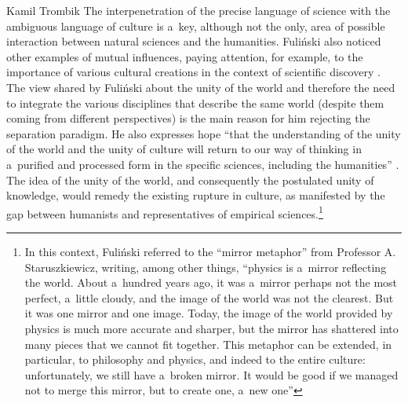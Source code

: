 \begin{artengenv}{Kamil Trombik}
The interpenetration of the precise language of science with the ambiguous language of culture is a~key, although not the only, area of possible interaction between natural sciences and the humanities. Fuliński also noticed other examples of mutual influences, paying attention, for example, to the importance of various cultural creations in the context of scientific discovery 
\parencite[][p.15]{janik_fizyka_1981}. %
 The view shared by Fuliński about the unity of the world and therefore the need to integrate the various disciplines that describe the same world (despite them coming from different perspectives) is the main reason for him rejecting the separation paradigm. He also expresses hope ``that the understanding of the unity of the world and the unity of culture will return to our way of thinking in a~purified and processed form in the specific sciences, including the humanities''
\parencite[][p.28]{janik_fizyka_1981}. %
 The idea of the unity of the world, and consequently the postulated unity of knowledge, would remedy the existing rupture in culture, as manifested by the gap between humanists and representatives of empirical sciences.\footnote{In this context, Fuliński referred to the ``mirror metaphor'' from Professor A. Staruszkiewicz, writing, among other things, ``physics is a~mirror reflecting the world. About a~hundred years ago, it was a~mirror perhaps not the most perfect, a~little cloudy, and the image of the world was not the clearest. But it was one mirror and one image. Today, the image of the world provided by physics is much more accurate and sharper, but the mirror has shattered into many pieces that we cannot fit together. This metaphor can be extended, in particular, to philosophy and physics, and indeed to the entire culture: unfortunately, we still have a~broken mirror. It would be good if we managed not to merge this mirror, but to create one, a~new one''
}
\end{artengenv}
